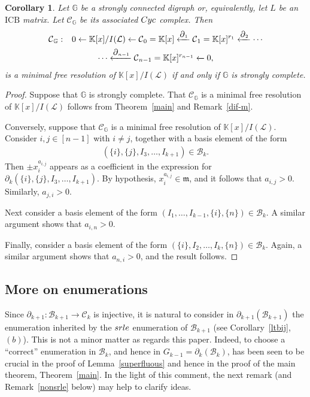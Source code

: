 \documentclass[10pt]{amsart}
\newcommand{\mbk}{\mbox{$\mathbb{K}$}}
\newcommand{\mbg}{\mbox{$\mathbb{G}$}}
\newcommand{\mcb}{\mbox{$\mathcal{B}$}}
\newcommand{\mcc}{\mbox{$\mathcal{C}$}}
\newcommand{\mcl}{\mbox{$\mathcal{L}$}}
\newcommand{\icb}{\mbox{$\mathrm{ICB}$}}
\newcommand{\mfm}{\mbox{$\mathfrak{m}$}}
\newcommand{\dif}{\mbox{$\partial$}}
\newcommand{\sdif}{\mbox{\tiny $\partial$}}
\newcommand{\cyc}{\mbox{${\rm Cyc}$}}
\newcommand{\srle}{\mbox{${\rm srle}$}}
\newtheorem{corollary}[cdrthm]{Corollary}
\theoremstyle{definition}
\theoremstyle{remark}
\begin{document}
\begin{corollary}\label{min-resolution}
Let $\mbg$ be a strongly connected digraph or, equivalently, let $L$
be an $\icb$ matrix. Let $\mcc_{\mathbb{G}}$ be its associated $\cyc$
complex. Then
\begin{multline*}
\mcc_{\mathbb{G}}:\phantom{+} 0\leftarrow \mbk[x]/I(\mcl)\leftarrow
\mcc_0=\mbk[x]\xleftarrow{\sdif_1} \mcc_1=\mbk[x]^{r_1}
\xleftarrow{\sdif_2} \cdots \\ \cdots 
\xleftarrow{\sdif_{n-1}}\mcc_{n-1}=\mbk[x]^{r_{n-1}}\xleftarrow{} 0,
\end{multline*}
is a minimal free resolution of $\mbk[x]/I(\mcl)$ if and only if
$\mbg$ is strongly complete.
\end{corollary}
\begin{proof}
Suppose that $\mbg$ is strongly complete. That $\mcc_{\mathbb{G}}$ is
a minimal free resolution of $\mbk[x]/I(\mcl)$ follows from
Theorem~\ref{main} and Remark~\ref{dif-m}.

Conversely, suppose that $\mcc_{\mathbb{G}}$ is a minimal free
resolution of $\mbk[x]/I(\mcl)$. Consider $i,j\in [n-1]$ with $i\neq
j$, together with a basis element of the form 
\begin{eqnarray*}
(\{i\},\{j\},I_3,\ldots ,I_{k+1})\in\mcb_k.
\end{eqnarray*}
Then $\pm x^{a_{i,j}}_i$ appears as a coefficient in the expression
for $\dif_k(\{i\},\{j\},I_3,\ldots ,I_{k+1})$. By hypothesis,
$x^{a_{i,j}}_i\in\mfm$, and it follows that $a_{i,j}>0$. Similarly,
$a_{j,i}>0$.

Next consider a basis element of the form $(I_1,\ldots
,I_{k-1},\{i\},\{n\})\in\mcb_k$. A similar argument shows that
$a_{i,n}>0$.

Finally, consider a basis element of the form $(\{i\},I_2,\ldots
,I_k,\{n\})\in\mcb_k$. Again, a similar argument shows that
$a_{n,i}>0$, and the result follows.
\end{proof}
\subsection{More on enumerations}

 Since $\dif_{k+1}:\mcb_{k+1}\to\mcc_{k}$ is injective, it is
natural to consider in $\dif_{k+1}(\mcb_{k+1})$ the enumeration
inherited by the $\srle$ enumeration of $\mcb_{k+1}$ (see
Corollary~\ref{ltbij}, $(b)$). This is not a minor matter as regards
this paper. Indeed, to choose a ``correct'' enumeration in $\mcb_{k}$,
and hence in $G_{k-1}=\dif_{k}(\mcb_{k})$, has been seen to be crucial
in the proof of Lemma~\ref{superfluous} and hence in the proof of the
main theorem, Theorem~\ref{main}. In the light of this comment, the
next remark (and Remark~\ref{nonsrle} below) may help to clarify
ideas.
\end{document}
